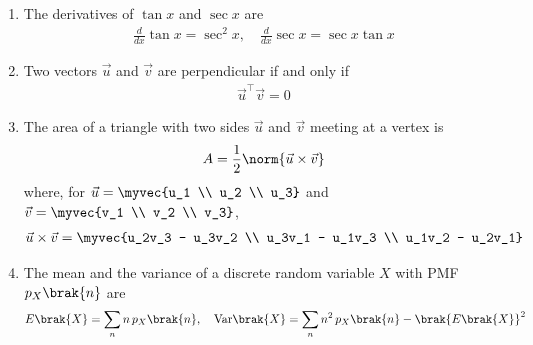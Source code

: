 \begin{enumerate}[label=\thesubsection.\arabic*, ref=\thesubsection.\theenumi]
\begin{align}
\end{align}
\solution
Multiplying the numerator and the denominator by $\cos x$ gives the first identity. For the second,
\begin{align}
	\frac{1}{1 + \sin x} = \frac{1 - \sin x}{1 - \sin^2 x} = \frac{1 - \sin x}{\cos^2 x}
\end{align}
which equals $\sec^2 x - \sec x\tan x$.
\item The derivatives of $\tan x$ and $\sec x$ are
\begin{align}
	\frac{d}{dx}\tan x = \sec^2 x, \quad \frac{d}{dx}\sec x = \sec x\tan x
	\label{eq:EE26BTECH11229-deriv-sec}
\end{align}
\item Two vectors $\vec{u}$ and $\vec{v}$ are perpendicular if and only if
\begin{align}
	\vec{u}^{\top}\vec{v} = 0
	\label{eq:EE26BTECH11229-perp-vec}
\end{align}
\item The area of a triangle with two sides $\vec{u}$ and $\vec{v}$ meeting at a vertex is
\begin{align}
	A = \frac{1}{2}\norm{\vec{u}\times\vec{v}}
	\label{eq:EE26BTECH11229-area-cross}
\end{align}
where, for $\vec{u} = \myvec{u_1 \\ u_2 \\ u_3}$ and $\vec{v} = \myvec{v_1 \\ v_2 \\ v_3}$,
\begin{align}
	\vec{u}\times\vec{v} = \myvec{u_2v_3 - u_3v_2 \\ u_3v_1 - u_1v_3 \\ u_1v_2 - u_2v_1}
\end{align}
\item The mean and the variance of a discrete random variable $X$ with PMF $p_X\brak{n}$ are
\begin{align}
	E\brak{X} = \sum_{n}n\,p_X\brak{n}, \quad
	\text{Var}\brak{X} = \sum_{n}n^2\,p_X\brak{n} - \brak{E\brak{X}}^2
	\label{eq:EE26BTECH11229-mean-var}
\end{align}


\end{enumerate}
